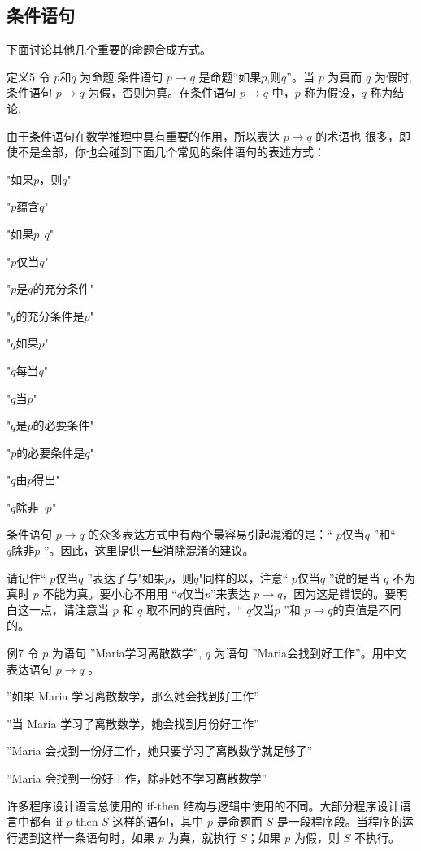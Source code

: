 \subsection{条件语句}
下面讨论其他几个重要的命题合成方式。

定义5  令 $p和q$ 为命题.条件语句 $p \to q$ 是命题“如果$p$,则$q$”。当 $p$ 为真而 $q$ 为假时,条件语句 $p \to q$ 为假，否则为真。在条件语句 $p \to q$ 中，$p$ 称为假设，$q$ 称为结论.

由于条件语句在数学推理中具有重要的作用，所以表达 $p \to q$ 的术语也 很多，即使不是全部，你也会碰到下面几个常见的条件语句的表述方式：

 "$\mbox{如果}p，\mbox{则}q$"

 "$p\mbox{蕴含}q$"

 "$\mbox{如果}p,q$"

 "$p\mbox{仅当}q$"
 
 "$p\mbox{是}q\mbox{的充分条件}$"

 "$q\mbox{的充分条件是}p$"

 "$q\mbox{如果}p$"

 "$q\mbox{每当}q$"

 "$q\mbox{当}p$"

 "$q\mbox{是}p\mbox{的必要条件}$"

 "$p\mbox{的必要条件是}q$"

 "$q\mbox{由}p\mbox{得出}$"

 "$q\mbox{除非}\neg p$"

条件语句 $p \to q$ 的众多表达方式中有两个最容易引起混淆的是：“ $p\mbox{仅当}q$ ”和“ $q \mbox{除非} p$ ”。因此，这里提供一些消除混淆的建议。

请记住“ $p\mbox{仅当}q$ ”表达了与"$\mbox{如果}p，\mbox{则}q$"同样的以，注意“ $p\mbox{仅当}q$ ”说的是当 $q$ 不为真时 $p$ 不能为真。要小心不用用 “$q \mbox{仅当} p$”来表达 $p \to q$，因为这是错误的。要明白这一点，请注意当 $p$ 和 $q$ 取不同的真值时，“ $q\mbox{仅当}p$ ”和 $p \to q$的真值是不同的。


例7 令 $p$ 为语句 ''Maria学习离散数学'', $q$ 为语句 ''Maria会找到好工作''。用中文表达语句 $p \to q$ 。

''如果 Maria 学习离散数学，那么她会找到好工作''

''当 Maria 学习了离散数学，她会找到月份好工作''

''Maria 会找到一份好工作，她只要学习了离散数学就足够了''

''Maria 会找到一份好工作，除非她不学习离散数学''


许多程序设计语言总使用的 if-then 结构与逻辑中使用的不同。大部分程序设计语言中都有 if $p$ then $S$ 这样的语句，其中 $p$ 是命题而 $S$ 是一段程序段。当程序的运行遇到这样一条语句时，如果 $p$ 为真，就执行 $S$；如果 $p$ 为假，则 $S$ 不执行。  

